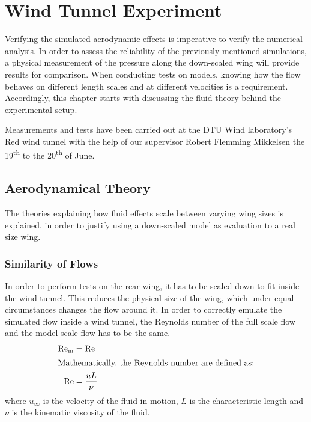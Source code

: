 \chapter{Wind Tunnel Experiment}
\label{chap:experiments}
  Verifying the simulated aerodynamic effects is imperative to verify the numerical analysis. In order to assess the reliability of the previously mentioned simulations, a physical measurement of the pressure along the down-scaled wing will provide results for comparison. When conducting tests on models, knowing how the flow behaves on different length scales and at different velocities is a requirement. Accordingly, this chapter starts with discussing the fluid theory behind the experimental setup.

  Measurements and tests have been carried out at the DTU Wind laboratory's Red wind tunnel with the help of our supervisor Robert Flemming Mikkelsen the 19\textsuperscript{th} to the 20\textsuperscript{th} of June.

\section{Aerodynamical Theory}

  The theories explaining how fluid effects scale between varying wing sizes is explained, in order to justify using a down-scaled model as evaluation to a real size wing.

  \subsection{Similarity of Flows}
  \label{sec:similarflows}

    In order to perform tests on the rear wing, it has to be scaled down to fit inside the wind tunnel. This reduces the physical size of the wing, which under equal circumstances changes the flow around it. In order to correctly emulate the simulated flow inside a wind tunnel, the Reynolds number of the full scale flow and the model scale flow has to be the same.
    \begin{align}
      \text{Re}_\text{m} &= \text{Re}\\
      \intertext{Mathematically, the Reynolds number are defined as:}
      \text{Re} &= \frac{u L}{\nu}
    \end{align}
    where $u_\infty$ is the velocity of the fluid in motion, $L$ is the characteristic length and $\nu$ is the kinematic viscosity of the fluid.

